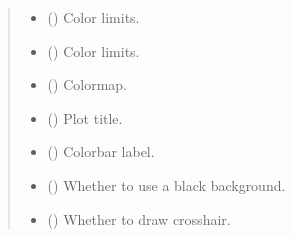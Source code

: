 \documentclass[letterpaper,10pt,english]{sphinxhowto}
\begin{document}
\begin{fulllineitems}
\begin{quote}
\begin{description}
\begin{itemize}
\item {} 
\sphinxAtStartPar
{} (\sphinxstyleliteralemphasis{\sphinxupquote{, }}) \textendash{} Color limits.

\item {} 
\sphinxAtStartPar
{} (\sphinxstyleliteralemphasis{\sphinxupquote{, }}) \textendash{} Color limits.

\item {} 
\sphinxAtStartPar
{} (\sphinxstyleliteralemphasis{\sphinxupquote{, }}) \textendash{} Colormap.

\item {} 
\sphinxAtStartPar
{} (\sphinxstyleliteralemphasis{\sphinxupquote{, }}) \textendash{} Plot title.

\item {} 
\sphinxAtStartPar
{} (\sphinxstyleliteralemphasis{\sphinxupquote{, }}) \textendash{} Colorbar label.

\item {} 
\sphinxAtStartPar
{} (\sphinxstyleliteralemphasis{\sphinxupquote{, }}) \textendash{} Whether to use a black background.

\item {} 
\sphinxAtStartPar
{} (\sphinxstyleliteralemphasis{\sphinxupquote{, }}) \textendash{} Whether to draw crosshair.


\end{itemize}
\end{description}
\end{quote}
\end{fulllineitems}
\end{document}
